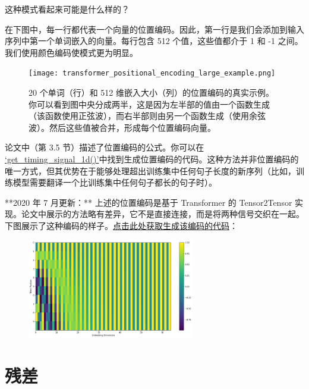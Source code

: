 \documentclass[cn,hazy,blue,10pt,normal]{elegantnote}
\begin{document}
这种模式看起来可能是什么样的？

在下图中，每一行都代表一个向量的位置编码。因此，第一行是我们会添加到输入序列中第一个单词嵌入的向量。每行包含 512 个值，这些值都介于 1 和 -1 之间。我们使用颜色编码使模式更为明显。

\begin{figure}[ht]
	\centering
	\texttt{[image: transformer\_positional\_encoding\_large\_example.png]}
	\caption{20 个单词（行）和 512 维嵌入大小（列）的位置编码的真实示例。你可以看到图中央分成两半，这是因为左半部的值由一个函数生成（该函数使用正弦波），而右半部则由另一个函数生成（使用余弦波）。然后这些值被合并，形成每个位置编码向量。}
\end{figure}

论文中（第 3.5 节）描述了位置编码的公式。你可以在 \href{https://github.com/tensorflow/tensor2tensor/blob/23bd23b9830059fbc349381b70d9429b5c40a139/tensor2tensor/layers/common_attention.py}{`get\_timing\_signal\_1d()'}中找到生成位置编码的代码。这种方法并非位置编码的唯一方式，但其优势在于能够处理超出训练集中任何句子长度的新序列（比如，训练模型需要翻译一个比训练集中任何句子都长的句子时）。

**2020 年 7 月更新：** 上述的位置编码是基于 Transformer 的 Tensor2Tensor 实现。论文中展示的方法略有差异，它不是直接连接，而是将两种信号交织在一起。下图展示了这种编码的样子。\href{https://github.com/jalammar/jalammar.github.io/blob/master/notebookes/transformer/transformer_positional_encoding_graph.ipynb}{点击此处获取生成该编码的代码}：

\begin{figure}[ht]
	\vspace{-10mm}
	\centering
	\includegraphics[width=0.65\textwidth]{image/attention-is-all-you-need-positional-encoding.png}
\end{figure}

\section{残差}
\end{document}
